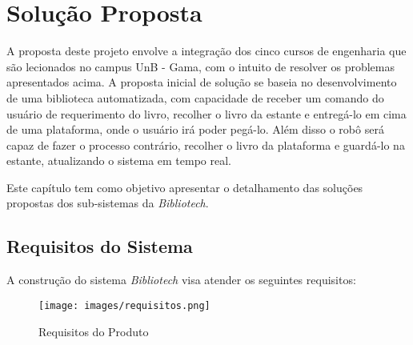 \chapter[Solução Proposta] {Solução Proposta}

A proposta deste projeto envolve a integração dos cinco cursos de engenharia que são lecionados no campus UnB - Gama, com o intuito de resolver os problemas apresentados acima. A proposta inicial de solução se baseia no desenvolvimento de uma biblioteca automatizada, com capacidade de receber um comando do usuário de requerimento do livro, recolher o livro da estante e entregá-lo em cima de uma plataforma, onde o usuário irá poder pegá-lo. Além disso o robô será capaz de fazer o processo contrário, recolher o livro da plataforma e guardá-lo na estante, atualizando o sistema em tempo real.

Este capítulo tem como objetivo apresentar o detalhamento das soluções propostas dos sub-sistemas da \textit{Bibliotech}.

\section{Requisitos do Sistema}
A construção do sistema \textit{Bibliotech} visa atender os seguintes requisitos: 
\begin{figure}[!htb]
     \centering
     \texttt{[image: images/requisitos.png]}
     \caption{Requisitos do Produto}
     \label{Requisitos do Produto}
\end{figure}